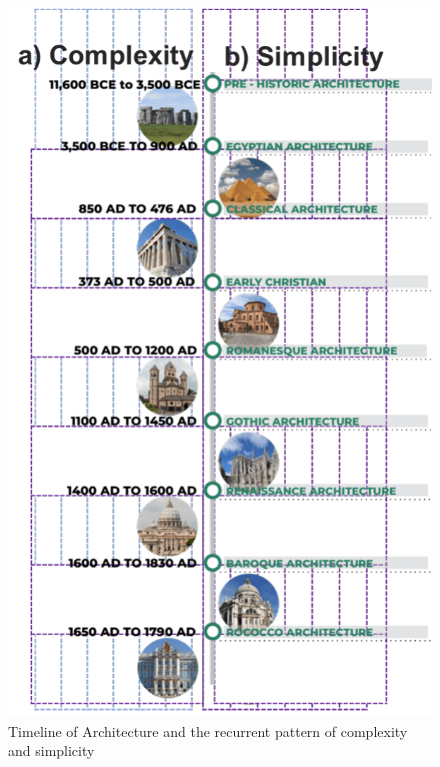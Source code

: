
     \begin{figure}[htb]
          \centering
          \includegraphics[width= \linewidth]{Images/TimelineArchitecture}
          \caption{Timeline of Architecture and the recurrent pattern of complexity and simplicity}
          \label{fig:TimelineArchitecture}
        \end{figure}

